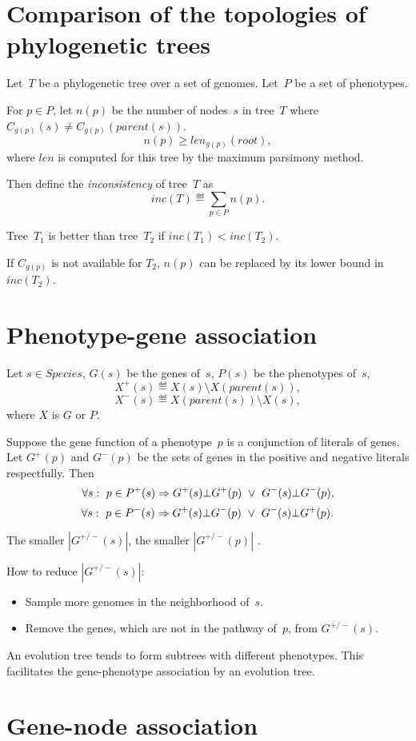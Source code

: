 \documentclass[10pt,a4paper]{article}
\theoremstyle{plain} \newtheorem{Lem}{Lemma}
\begin{document}
\section {Comparison of the topologies of phylogenetic trees}
Let~$T$ be a phylogenetic tree over a set of genomes.
Let~$P$ be a set of phenotypes.

For $p \in P$, let $n(p)$ be the number of nodes~$s$ in tree~$T$ where $C_{g(p)}(s) \ne C_{g(p)}(parent(s))$.
$$ n(p) \ge len_{g(p)}(root), $$
where $len$ is computed for this tree by the maximum parsimony method.

Then define the {\em inconsistency} of tree~$T$ as 
$$ inc(T) \eqdef \sum_{p \in P} n(p). $$

Tree~$T_1$ is better than tree~$T_2$ if $inc(T_1) < inc(T_2)$.

If $C_{g(p)}$ is not available for $T_2$, $n(p)$ can be replaced by its lower bound in $inc(T_2)$.


\section {Phenotype-gene association}

Let $s \in Species$, 
$G(s)$ be the genes of~$s$,
$P(s)$ be the phenotypes of~$s$,
$$ X^+(s) \eqdef X(s) \setminus X(parent(s)), $$
$$ X^-(s) \eqdef X(parent(s)) \setminus X(s), $$
where $X$ is $G$ or $P$.

Suppose the gene function of a phenotype~$p$ is a conjunction of literals of genes.
Let $G^+(p)$ and $G^-(p)$ be the sets of genes in the positive and negative literals respectfully.
Then
$$ \forall s: \ p \in P^+(s) \Rightarrow G^+(s) \bot G^+(p) \ \vee \  G^-(s) \bot G^-(p), $$
$$ \forall s: \ p \in P^-(s) \Rightarrow G^+(s) \bot G^-(p) \ \vee \  G^-(s) \bot G^+(p). $$

The smaller $|G^{+/-}(s)|$, the smaller $|G^{+/-}(p)|$ .

How to reduce $|G^{+/-}(s)|$:
\begin{itemize}
  \item Sample more genomes in the neighborhood of~$s$.
  \item Remove the genes, which are not in the pathway of~$p$, from $G^{+/-}(s)$.
\end{itemize}

\comm {}
An evolution tree tends to form subtrees with different phenotypes.
This facilitates the gene-phenotype association by an evolution tree.


\section {Gene-node association}
\end{document}
